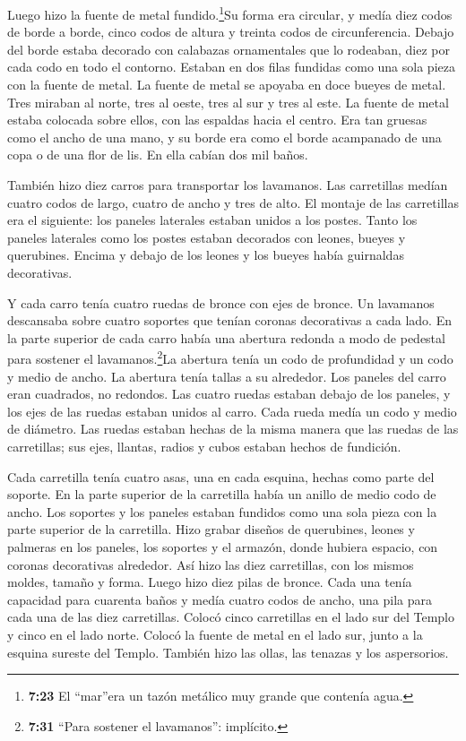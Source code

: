  Luego hizo la fuente de metal fundido.\footnote{\textbf{7:23}
  El ``mar''era un tazón metálico muy grande que contenía agua.}Su forma
era circular, y medía diez codos de borde a borde, cinco codos de altura
y treinta codos de circunferencia.  Debajo del borde estaba
decorado con calabazas ornamentales que lo rodeaban, diez por cada codo
en todo el contorno. Estaban en dos filas fundidas como una sola pieza
con la fuente de metal.  La fuente de metal se apoyaba en
doce bueyes de metal. Tres miraban al norte, tres al oeste, tres al sur
y tres al este. La fuente de metal estaba colocada sobre ellos, con las
espaldas hacia el centro.  Era tan gruesas como el ancho de
una mano, y su borde era como el borde acampanado de una copa o de una
flor de lis. En ella cabían dos mil baños.

 También hizo diez carros para transportar los lavamanos.
Las carretillas medían cuatro codos de largo, cuatro de ancho y tres de
alto.  El montaje de las carretillas era el siguiente: los
paneles laterales estaban unidos a los postes.  Tanto los
paneles laterales como los postes estaban decorados con leones, bueyes y
querubines. Encima y debajo de los leones y los bueyes había guirnaldas
decorativas.

 Y cada carro tenía cuatro ruedas de bronce con ejes de
bronce. Un lavamanos descansaba sobre cuatro soportes que tenían coronas
decorativas a cada lado.  En la parte superior de cada
carro había una abertura redonda a modo de pedestal para sostener el
lavamanos.\footnote{\textbf{7:31} ``Para sostener el lavamanos'':
  implícito.}La abertura tenía un codo de profundidad y un codo y medio
de ancho. La abertura tenía tallas a su alrededor. Los paneles del carro
eran cuadrados, no redondos.  Las cuatro ruedas estaban
debajo de los paneles, y los ejes de las ruedas estaban unidos al carro.
Cada rueda medía un codo y medio de diámetro.  Las ruedas
estaban hechas de la misma manera que las ruedas de las carretillas; sus
ejes, llantas, radios y cubos estaban hechos de fundición.

 Cada carretilla tenía cuatro asas, una en cada esquina,
hechas como parte del soporte.  En la parte superior de la
carretilla había un anillo de medio codo de ancho. Los soportes y los
paneles estaban fundidos como una sola pieza con la parte superior de la
carretilla.  Hizo grabar diseños de querubines, leones y
palmeras en los paneles, los soportes y el armazón, donde hubiera
espacio, con coronas decorativas alrededor.  Así hizo las
diez carretillas, con los mismos moldes, tamaño y forma. 
Luego hizo diez pilas de bronce. Cada una tenía capacidad para cuarenta
baños y medía cuatro codos de ancho, una pila para cada una de las diez
carretillas.  Colocó cinco carretillas en el lado sur del
Templo y cinco en el lado norte. Colocó la fuente de metal en el lado
sur, junto a la esquina sureste del Templo.  También hizo
las ollas, las tenazas y los aspersorios.

